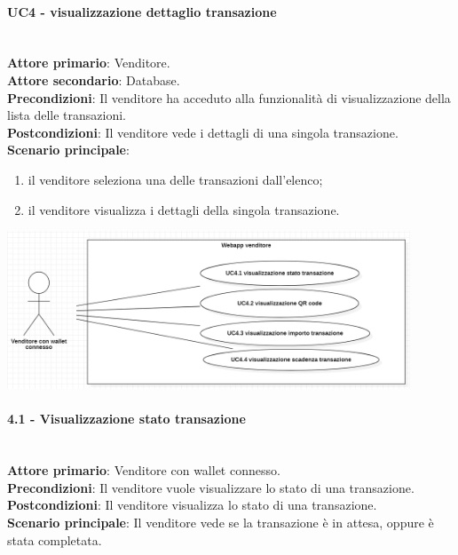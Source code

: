 \documentclass[a4paper, 12pt]{article}
\begin{document}
\paragraph{UC4 - visualizzazione dettaglio transazione}\\
\textbf{Attore primario}: Venditore.\\
\textbf{Attore secondario}: Database.\\
\textbf{Precondizioni}: Il venditore ha acceduto alla funzionalità di visualizzazione della lista delle transazioni.\\
\textbf{Postcondizioni}: Il venditore vede i dettagli di una singola transazione.\\
\textbf{Scenario principale}:
\begin{enumerate}
\item il venditore seleziona una delle transazioni dall'elenco;
\item il venditore visualizza i dettagli della singola transazione.
\end{enumerate}

\includegraphics[width=0.9\textwidth]{UC_WAV4}

\paragraph{4.1 - Visualizzazione stato transazione}\\
\textbf{Attore primario}: Venditore con wallet connesso.\\
\textbf{Precondizioni}: Il venditore vuole visualizzare lo stato di una transazione.\\
\textbf{Postcondizioni}: Il venditore visualizza lo stato di una transazione.\\
\textbf{Scenario principale}: Il venditore vede se la transazione è in attesa, oppure è stata completata.\\
\end{document}
